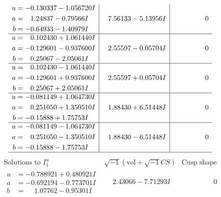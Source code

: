 \documentclass[1p]{elsarticle_modified}
\theoremstyle{definition}
\newcommand{\I}{\sqrt{-1}}
\begin{document}
$$\begin{array}{c|c|c}
\begin{aligned}
u &= -0.130337 - 1.056720 I \\
a &= \phantom{-}1.24837 - 0.79566 I \\
b &= -0.64933 - 1.40979 I\end{aligned}
 & \phantom{-}7.56133 - 5.13956 I & \phantom{-0.000000 } 0 \\ \hline\begin{aligned}
u &= \phantom{-}0.102430 + 1.061440 I \\
a &= -0.129601 - 0.937600 I \\
b &= \phantom{-}0.25067 - 2.05061 I\end{aligned}
 & \phantom{-}2.55597 - 0.05704 I & \phantom{-0.000000 } 0 \\ \hline\begin{aligned}
u &= \phantom{-}0.102430 - 1.061440 I \\
a &= -0.129601 + 0.937600 I \\
b &= \phantom{-}0.25067 + 2.05061 I\end{aligned}
 & \phantom{-}2.55597 + 0.05704 I & \phantom{-0.000000 } 0 \\ \hline\begin{aligned}
u &= -0.081149 + 1.064730 I \\
a &= \phantom{-}0.251050 + 1.350510 I \\
b &= -0.15888 + 1.75753 I\end{aligned}
 & \phantom{-}1.88430 + 6.51448 I & \phantom{-0.000000 } 0 \\ \hline\begin{aligned}
u &= -0.081149 - 1.064730 I \\
a &= \phantom{-}0.251050 - 1.350510 I \\
b &= -0.15888 - 1.75753 I\end{aligned}
 & \phantom{-}1.88430 - 6.51448 I & \phantom{-0.000000 } 0\\
 \hline 
 \end{array}$$\newpage$$\begin{array}{c|c|c}  
\text{Solutions to }I^u_{1}& \I (\text{vol} + \sqrt{-1}CS) & \text{Cusp shape}\\
 \hline 
\begin{aligned}
u &= -0.788921 + 0.480921 I \\
a &= -0.692194 - 0.773701 I \\
b &= \phantom{-}1.07762 - 0.95301 I\end{aligned}
 & \phantom{-}2.43066 - 7.71293 I & \phantom{-0.000000 } 0 \\ \hline\begin{aligned}

\end{aligned}
\end{array}$$
\end{document}
